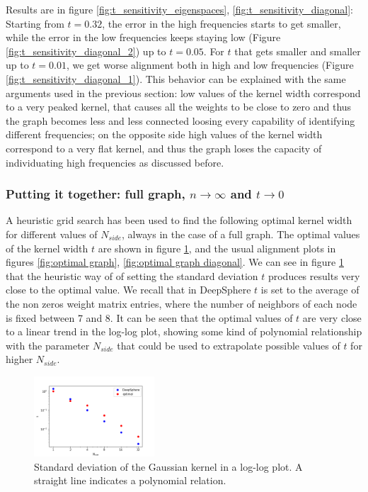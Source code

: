 Results are in figure \ref{fig:t_sensitivity_eigenspaces}, \ref{fig:t_sensitivity_diagonal}: Starting from $t=0.32$, the error in the high frequencies starts to get smaller, while the error in the low frequencies keeps staying low (Figure \ref{fig:t_sensitivity_diagonal_2}) up to $t=0.05$. For $t$ that gets smaller and smaller up to $t=0.01$, we get worse alignment both in high and low frequencies (Figure \ref{fig:t_sensitivity_diagonal_1}). This behavior can be explained with the same arguments used in the previous section: low values of the kernel width correspond to a very peaked kernel, that causes all the weights to be close to zero and thus the graph becomes less and less connected loosing every capability of identifying different frequencies; on the opposite side high values of the kernel width correspond to a very flat kernel, and thus the graph loses the capacity of individuating high frequencies as discussed before.

\subsubsection{Putting it together: full graph, $n\to\infty$ and $t\to 0$}
A heuristic grid search has been used to find the following optimal kernel width for different values of $N_{side}$, always in the case of a full graph. The optimal values of the kernel width $t$ are shown in figure \ref{fig:t}, and the usual alignment plots in figures \ref{fig:optimal graph}, \ref{fig:optimal graph diagonal}. We can see in figure \ref{fig:t} that the heuristic way of \cite{DeepSphere} of setting the standard deviation $t$ produces results very close to the optimal value. We recall that in DeepSphere $t$ is set to the average of the non zeros weight matrix entries, where the number of neighbors of each node is fixed between 7 and 8. It can be seen that the optimal values of $t$ are very close to a linear trend in the log-log plot, showing some kind of polynomial relationship with the parameter $N_{side}$ that could be used to extrapolate possible values of $t$ for higher $N_{side}$.

\begin{figure}[h]
	\centering
	\includegraphics[width=0.4\textwidth]{../codes/02.HeatKernelGraphLaplacian/HEALPix/06_figures/kernelwidth.png}
\caption{\label{fig:t}Standard deviation of the Gaussian kernel  in a log-log plot. A straight line indicates a polynomial relation.}
\end{figure}

